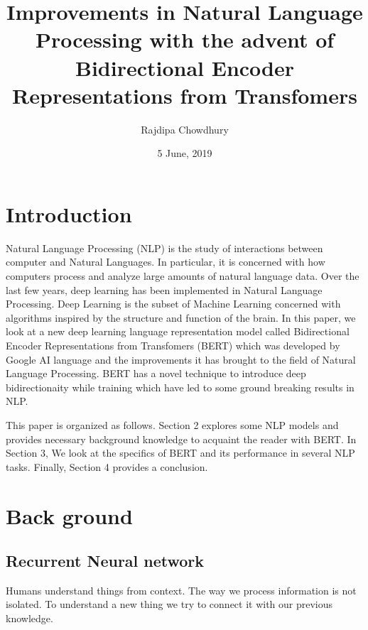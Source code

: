 \documentclass[12pt,a4paper]{article}
\numberwithin{equation}{section}
\begin{document}
\title{Improvements in Natural Language Processing with the advent of Bidirectional Encoder Representations from Transfomers}


\author{Rajdipa Chowdhury}









 


\date{5 June, 2019}

\maketitle

\section{Introduction} 
Natural Language Processing (NLP) is the study of interactions between computer and Natural Languages. In particular, it is concerned with how computers process and analyze large amounts of natural language data. Over the last few years, deep learning has been implemented in Natural Language Processing. Deep Learning  is the subset of Machine Learning concerned with algorithms inspired by the structure and function of the brain. In this paper, we look at a new deep learning language representation model called Bidirectional Encoder Representations from Transfomers (BERT) which was developed by Google AI language and the improvements it has brought to the field of Natural Language Processing. BERT has a novel technique to introduce deep bidirectionaity while training which have led to some ground breaking results in NLP.   

This paper is organized as follows. Section 2 explores some NLP models and provides necessary background knowledge to acquaint the reader with BERT. In Section 3, We look at the specifics of BERT and its performance in several NLP tasks. Finally, Section 4 provides a conclusion. 
\section{Back ground}

\subsection{Recurrent Neural network}

Humans understand things from context. The way we process information is not isolated. To understand a new thing we try to connect it with our previous knowledge. 
\end{document}
